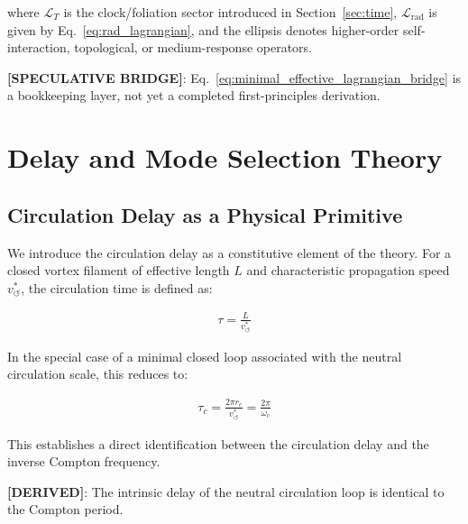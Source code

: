\documentclass[11pt]{article}
\theoremstyle{definition}
\theoremstyle{plain}
\theoremstyle{remark}
\newcommand{\rc}{{r_c}}
\newcommand{\vchar}{v_{\!\boldsymbol{\circlearrowleft}}^{\ast}}
\begin{document}
        where $\mathcal{L}_{T}$ is the clock/foliation sector introduced in Section~\ref{sec:time}, $\mathcal{L}_{\mathrm{rad}}$ is given by Eq.~\eqref{eq:rad_lagrangian}, and the ellipsis denotes higher-order self-interaction, topological, or medium-response operators.

        \textbf{[SPECULATIVE BRIDGE]}: Eq.~\eqref{eq:minimal_effective_lagrangian_bridge} is a bookkeeping layer, not yet a completed first-principles derivation.

        
\section{Delay and Mode Selection Theory}
    \label{sec:delay}
    
    \subsection{Circulation Delay as a Physical Primitive}
        
        We introduce the circulation delay as a constitutive element of the theory.
        For a closed vortex filament of effective length $L$ and characteristic propagation speed $\vchar$, the circulation time is defined as:
        
        \begin{align}
            \tau = \frac{L}{\vchar}
            \label{eq:delay_time}
        \end{align}
        
        In the special case of a minimal closed loop associated with the neutral circulation scale, this reduces to:
        
        \begin{align}
            \tau_c = \frac{2\pi \rc}{\vchar} = \frac{2\pi}{\omega_c}
            \label{eq:compton_delay}
        \end{align}
        
        This establishes a direct identification between the circulation delay and the inverse Compton frequency.
        
        \textbf{[DERIVED]}: The intrinsic delay of the neutral circulation loop is identical to the Compton period.
    
\end{document}
